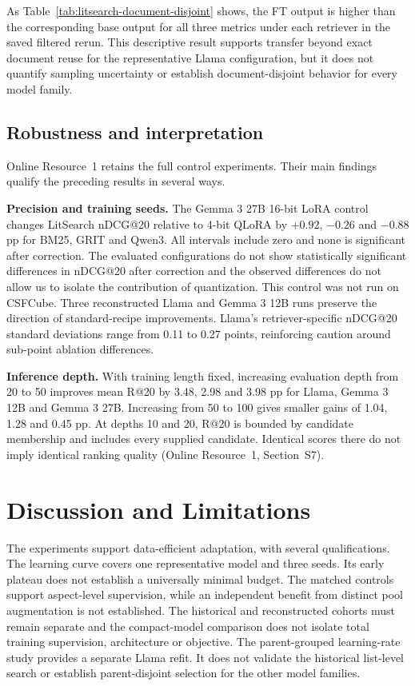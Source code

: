 \documentclass[pdflatex,sn-basic,Numbered]{sn-jnl}%
\theoremstyle{thmstyleone}%
\theoremstyle{thmstyletwo}%
\theoremstyle{thmstylethree}%
\begin{document}
\begin{samepage}
As Table~\ref{tab:litsearch-document-disjoint} shows, the FT output is higher than the corresponding base output for all three metrics
under each retriever in the saved filtered rerun. This descriptive result supports
transfer beyond exact document reuse for the representative Llama configuration,
but it does not quantify sampling uncertainty or establish document-disjoint
behavior for every model family.
\par
\end{samepage}

\subsection{Robustness and interpretation}
\label{sec:robustness}
Online Resource~1 retains the full control experiments. Their main findings
qualify the preceding results in several ways.

\textbf{Precision and training seeds.} The Gemma 3 27B 16-bit LoRA control
changes LitSearch nDCG@20 relative to 4-bit QLoRA by $+0.92$, $-0.26$ and
$-0.88$ pp for BM25, GRIT and Qwen3. All intervals include zero and none is
significant after correction. The evaluated configurations do not show statistically significant differences in nDCG@20 after correction and the observed differences do not allow us to isolate the contribution of quantization. This control was not run on CSFCube. Three reconstructed
Llama and Gemma 3 12B runs preserve the direction of standard-recipe improvements.
Llama's retriever-specific nDCG@20 standard deviations range from 0.11 to 0.27
points, reinforcing caution around sub-point ablation differences.

\textbf{Inference depth.} With training length fixed, increasing evaluation
depth from 20 to 50 improves mean R@20 by 3.48, 2.98 and 3.98 pp for Llama,
Gemma 3 12B and Gemma 3 27B. Increasing from 50 to 100 gives smaller gains
of 1.04, 1.28 and 0.45 pp. At depths 10 and 20, R@20 is bounded by candidate
membership and includes every supplied candidate. Identical scores there do
not imply identical ranking quality (Online Resource~1, Section~S7).

\section{Discussion and Limitations}
\label{sec:discussion}
The experiments support data-efficient adaptation, with several qualifications.
The learning curve covers one representative model and three seeds. Its early
plateau does not establish a universally minimal budget. The matched controls
support aspect-level supervision, while an independent benefit from distinct
pool augmentation is not established. The historical and reconstructed cohorts
must remain separate and the compact-model comparison does not isolate total
training supervision, architecture or objective.
The parent-grouped learning-rate study provides a separate Llama refit. It does
not validate the historical list-level search or establish parent-disjoint
selection for the other model families.
\end{document}
